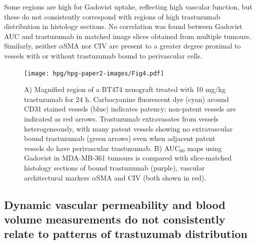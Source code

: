 Some regions are high for Gadovist uptake, reflecting high vascular function, but these do not consistently correspond with regions of high trastuzumab distribution in histology sections.
No correlation was found between Gadovist AUC and trastuzumab in matched image slices obtained from multiple tumours.
Similarly, neither $\alpha$SMA nor CIV are present to a greater degree proximal to vessels with or without trastuzumab bound to perivascular cells.

\begin{figure}[htbp] %
  \centering
  \texttt{[image: hpg/hpg-paper2-images/Fig4.pdf]} 
  \caption{A) Magnified region of a \acs{BT474} xenograft treated with 10 mg/kg trastuzumab for 24 h. 
  Carbocyanine fluorescent dye (cyan) around CD31 stained vessels (blue) indicates patency; non-patent vessels are indicated as red arrows.
  Trastuzumab extravasates from vessels heterogeneously, with many patent vessels showing no extravascular bound trastuzumab (green arrows) even when adjacent patent vessels do have perivascular trastuzumab. 
  B) \acs{AUC}$_60$ maps using Gadovist in \acs{MDA-MB-361} tumours is compared with slice-matched histology sections of bound trastuzumab (purple), vascular architectural markers $\alpha$SMA and CIV (both shown in red).}
  \label{hpgpaper2:fig4}
\end{figure}

\subsection{Dynamic vascular permeability and blood volume measurements do not consistently relate to patterns of trastuzumab distribution}


